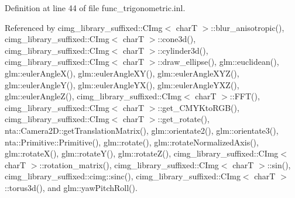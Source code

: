 Definition at line 44 of file func\+\_\+trigonometric.\+inl.



Referenced by cimg\+\_\+library\+\_\+suffixed\+::\+C\+Img$<$ char\+T $>$\+::blur\+\_\+anisotropic(), cimg\+\_\+library\+\_\+suffixed\+::\+C\+Img$<$ char\+T $>$\+::cone3d(), cimg\+\_\+library\+\_\+suffixed\+::\+C\+Img$<$ char\+T $>$\+::cylinder3d(), cimg\+\_\+library\+\_\+suffixed\+::\+C\+Img$<$ char\+T $>$\+::draw\+\_\+ellipse(), glm\+::euclidean(), glm\+::euler\+Angle\+X(), glm\+::euler\+Angle\+X\+Y(), glm\+::euler\+Angle\+X\+Y\+Z(), glm\+::euler\+Angle\+Y(), glm\+::euler\+Angle\+Y\+X(), glm\+::euler\+Angle\+Y\+X\+Z(), glm\+::euler\+Angle\+Z(), cimg\+\_\+library\+\_\+suffixed\+::\+C\+Img$<$ char\+T $>$\+::\+F\+F\+T(), cimg\+\_\+library\+\_\+suffixed\+::\+C\+Img$<$ char\+T $>$\+::get\+\_\+\+C\+M\+Y\+Kto\+R\+G\+B(), cimg\+\_\+library\+\_\+suffixed\+::\+C\+Img$<$ char\+T $>$\+::get\+\_\+rotate(), nta\+::\+Camera2\+D\+::get\+Translation\+Matrix(), glm\+::orientate2(), glm\+::orientate3(), nta\+::\+Primitive\+::\+Primitive(), glm\+::rotate(), glm\+::rotate\+Normalized\+Axis(), glm\+::rotate\+X(), glm\+::rotate\+Y(), glm\+::rotate\+Z(), cimg\+\_\+library\+\_\+suffixed\+::\+C\+Img$<$ char\+T $>$\+::rotation\+\_\+matrix(), cimg\+\_\+library\+\_\+suffixed\+::\+C\+Img$<$ char\+T $>$\+::sin(), cimg\+\_\+library\+\_\+suffixed\+::cimg\+::sinc(), cimg\+\_\+library\+\_\+suffixed\+::\+C\+Img$<$ char\+T $>$\+::torus3d(), and glm\+::yaw\+Pitch\+Roll().

